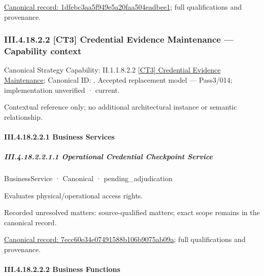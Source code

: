 {\footnotesize \href{../../../../../../../../continuum/business/business-function/1dfebc3aa5f949e5a20faa504eadbee1.md}{Canonical record: 1dfebc3aa5f949e5a20faa504eadbee1}; full qualifications and provenance.}\par
\subsubsection*{III.4.18.2.2 [CT3] Credential Evidence Maintenance — Capability context}
\label{navigation:III.4.18.2.2}

{\small Canonical Strategy Capability: II.1.1.8.2.2 \hyperref[element:ece496e1dc7e4a319318ef6811dfece7]{[CT3] Credential Evidence Maintenance}; Canonical ID: \texttt{}. Accepted replacement model — Pass3/014; implementation unverified · current.}\par
Contextual reference only; no additional architectural instance or semantic relationship.\par
\paragraph*{III.4.18.2.2.1 Business Services}
\label{navigation:III.4.18.2.2.1}

\subparagraph*{III.4.18.2.2.1.1 Operational Credential Checkpoint Service}
\label{navigation:III.4.18.2.2.1.1}

\label{element:7ecc60e34e07491588b106b9075ab09a}
{\small BusinessService · Canonical · pending\_adjudication}\par

Evaluates physical/operational access rights.


{\small Recorded unresolved matters: source-qualified matters; exact scope remains in the canonical record.}\par
{\footnotesize \href{../../../../../../../../continuum/business/business-service/7ecc60e34e07491588b106b9075ab09a.md}{Canonical record: 7ecc60e34e07491588b106b9075ab09a}; full qualifications and provenance.}\par
\paragraph*{III.4.18.2.2.2 Business Functions}
\label{navigation:III.4.18.2.2.2}

